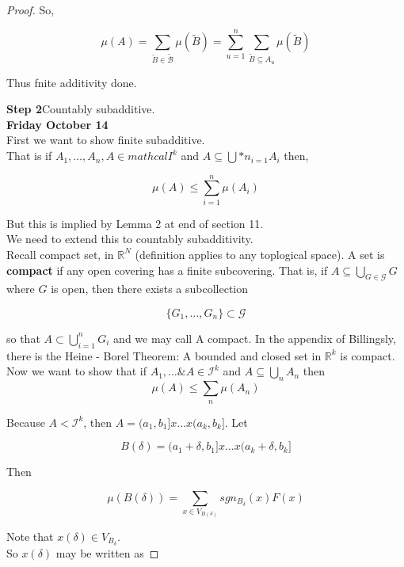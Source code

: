\documentclass[11pt,fleqn]{book} %
\begin{document}
\begin{proof}
			So, 

						$$ \mu(A) = \sum_{\tilde{B} \in \tilde{\mathcal{B}}} \mu(\tilde{B}) = \sum^n_{u=1} \sum_{\tilde{B} \subseteq A_u} \mu(\tilde{B})$$

			Thus fnite additivity done. 

	\textbf{Step 2}Countably subadditive. 	\\

	\textbf{Friday October 14}\\

	First we want to show finite subadditive.\\

	That is if $A_1, \dots, A_n, A \in mathcal{I}^k$ and $A \subseteq \bigcup*n_{i=1} A_i $ then, 

			$$ \mu(A) \leq \sum^n_{i=1} \mu(A_i) $$

	But this is implied by Lemma 2 at end of section 11.\\

	We need to extend this to countably subadditivity. \\ 

	Recall compact set, in $\mathbb{R}^N$ (definition applies to any toplogical space).  A set is \textbf{compact} if any open covering has a finite subcovering. That is, if $A \subseteq \bigcup_{G \in \mathcal{G}} G$ where $G$ is open, then there exists a subcollection

			$$\{G_1, \dots, G_n \} \subset \mathcal{G} $$

	so that $ A \subset \bigcup_{i=1}^n G_i$ and we may call A compact. In the appendix of Billingsly, there is the Heine - Borel Theorem: A bounded and closed set in $\mathbb{R}^k$ is compact.\\

	Now we want to show that if $A_1, \dots \& A \in \mathcal{I}^k$ and $A \subseteq \bigcup_n A_n $ then
			$$\mu(A) \leq \sum_n \mu(A_n) $$


		Because $A < \mathcal{I}^k$, then $A = (a_1, b_1] x \dots x (a_k, b_k]$. Let

				$$ B(\delta) = (a_1 + \delta, b_1] x \dots x (a_k + \delta, b_k]$$

		Then 

				$$\mu(B (\delta)) = \sum_{x \in V _{B(\delta)}} sgn_{B_\delta} (x) F(x) $$

		Note that $x(\delta) \in V_{B_\delta}$.\\

		So $x(\delta)$ may be written as 


\end{proof}
\end{document}
